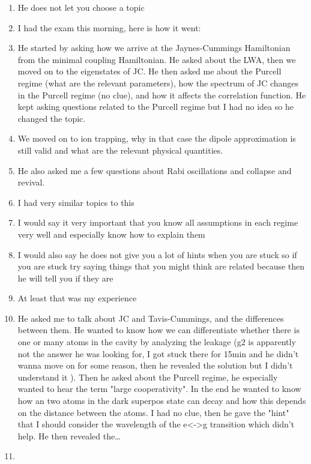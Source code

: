 \documentclass{article}%
\begin{document}
%
\normalsize%
\begin{enumerate}%
\item%
He does not let you choose a topic%
\item%
I had the exam this morning, here is how it went:%
\item%
He started by asking how we arrive at the Jaynes{-}Cummings Hamiltonian from the minimal coupling Hamiltonian. He asked about the LWA, then we moved on to the eigenstates of JC. He then asked me about the Purcell regime (what are the relevant parameters), how the spectrum of JC changes in the Purcell regime (no clue), and how it affects the correlation function. He kept asking questions related to the Purcell regime but I had no idea so he changed the topic. %
\item%
We moved on to ion trapping, why in that case the dipole approximation is still valid and what are the relevant physical quantities. %
\item%
He also asked me a few questions about Rabi oscillations and collapse and revival.%
\item%
I had very similar topics to this%
\item%
I would say it very important that you know all assumptions in each regime very well and especially know how to explain them%
\item%
I would also say he does not give you a lot of hints when you are stuck so if you are stuck try saying things that you might think are related because then he will tell you if they are%
\item%
At least that was my experience%
\item%
\begin{mycolorbox}
He asked me to talk about JC and Tavis{-}Cummings, and the differences between them. He wanted to know how we can differentiate whether there is one or many atoms in the cavity by analyzing the leakage (g2 is apparently not the answer he was looking for, I got stuck there for 15min and he didn't wanna move on for some reason, then he revealed the solution but I didn't understand it ). Then he asked about the Purcell regime, he especially wanted to hear the term "large cooperativity". In the end he wanted to know how an two atoms in the dark superpos state can decay and how this depends on the distance between the atoms. I had no clue, then he gave the "hint" that I should consider the wavelength of the e<{-}>g transition which didn't help. He then revealed the…%
\end{mycolorbox}
\item%

\end{enumerate}
\end{document}
